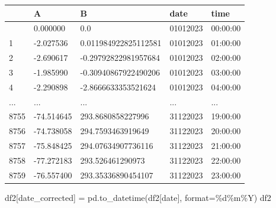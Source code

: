 \documentclass[
  letterpaper,
  DIV=11,
  numbers=noendperiod,
  oneside]{scrreprt}
\newenvironment{Shaded}{\begin{snugshade}}{\end{snugshade}}
\newcommand{\BuiltInTok}[1]{\textcolor[rgb]{0.00,0.23,0.31}{#1}}
\newcommand{\NormalTok}[1]{\textcolor[rgb]{0.00,0.23,0.31}{#1}}
\newcommand{\OperatorTok}[1]{\textcolor[rgb]{0.37,0.37,0.37}{#1}}
\newcommand{\SpecialCharTok}[1]{\textcolor[rgb]{0.37,0.37,0.37}{#1}}
\newcommand{\StringTok}[1]{\textcolor[rgb]{0.13,0.47,0.30}{#1}}
\begin{document}
\begin{longtable}[]{@{}lllll@{}}
\toprule\noalign{}
& A & B & date & time \\
\midrule\noalign{}
\endhead
\bottomrule\noalign{}
\endlastfoot
0 & 0.000000 & 0.0 & 01012023 & 00:00:00 \\
1 & -2.027536 & 0.011984922825112581 & 01012023 & 01:00:00 \\
2 & -2.690617 & -0.29792822981957684 & 01012023 & 02:00:00 \\
3 & -1.985990 & -0.30940867922490206 & 01012023 & 03:00:00 \\
4 & -2.290898 & -2.8666633353521624 & 01012023 & 04:00:00 \\
... & ... & ... & ... & ... \\
8755 & -74.514645 & 293.8680858227996 & 31122023 & 19:00:00 \\
8756 & -74.738058 & 294.7593463919649 & 31122023 & 20:00:00 \\
8757 & -75.848425 & 294.07634907736116 & 31122023 & 21:00:00 \\
8758 & -77.272183 & 293.526461290973 & 31122023 & 22:00:00 \\
8759 & -76.557400 & 293.35336890454107 & 31122023 & 23:00:00 \\
\end{longtable}

\begin{Shaded}
\begin{Highlighting}[]
\NormalTok{df2[}\StringTok{\textquotesingle{}date\_corrected\textquotesingle{}}\NormalTok{] }\OperatorTok{=}\NormalTok{ pd.to\_datetime(df2[}\StringTok{\textquotesingle{}date\textquotesingle{}}\NormalTok{], }\BuiltInTok{format}\OperatorTok{=}\StringTok{\textquotesingle{}}\SpecialCharTok{\%d}\StringTok{\%m\%Y\textquotesingle{}}\NormalTok{)}
\NormalTok{df2}
\end{Highlighting}
\end{Shaded}
\end{document}
